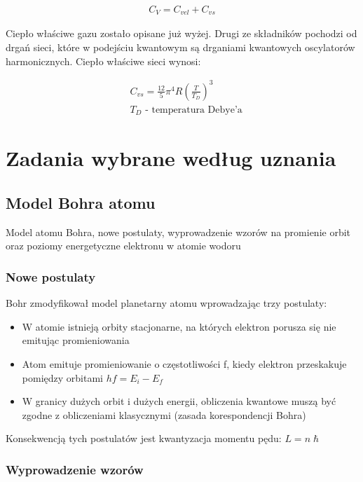 \documentclass[a4paper,15pt]{article}
\newcommand{\issue}[2]{
    \begin{tcolorbox}[colback=issueColor!5!white,colframe=issueColor,title={Zagadnienie #1}]
        #2
    \end{tcolorbox}
}
\begin{document}
\begin{align*}
C_V = C_{vel} + C_{vs}
\end{align*}

Ciepło właściwe gazu zostało opisane już wyżej. Drugi ze składników pochodzi od drgań sieci, które w podejściu kwantowym są drganiami kwantowych oscylatorów harmonicznych. Ciepło właściwe sieci wynosi:

\begin{align*}
& C_{vs} = \frac{12}{5}\pi ^4 R(\frac{T}{T_D})^3 \\
& T_D \text{ - temperatura Debye'a}
\end{align*}


\newpage
\section{Zadania wybrane według uznania}

\subsection{Model Bohra atomu}
\issue{}{
Model atomu Bohra, nowe postulaty, wyprowadzenie wzorów na promienie orbit oraz poziomy energetyczne elektronu w atomie wodoru
}


\subsubsection{Nowe postulaty}
Bohr zmodyfikował model planetarny atomu wprowadzając trzy postulaty:

\begin{itemize}
\item W atomie istnieją orbity stacjonarne, na których elektron porusza się nie emitując promieniowania 
\item Atom emituje promieniowanie o częstotliwości f, kiedy elektron przeskakuje pomiędzy orbitami $hf = E_i - E_f$
\item W granicy dużych orbit i dużych energii, obliczenia kwantowe muszą być zgodne z obliczeniami klasycznymi (zasada korespondencji Bohra)
\end{itemize}

Konsekwencją tych postulatów jest kwantyzacja momentu pędu: $L = n\hslash$



\subsubsection{Wyprowadzenie wzorów}
\end{document}
